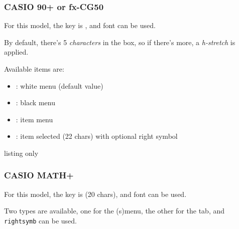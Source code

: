 \documentclass[11pt,a4paper]{ltxdoc}
\begin{document}
\subsubsection{CASIO 90+ or fx-CG50}

For this model, the key is \ShowCode{[model=90+]}, and font \ShowCode{[font=\\fontCASIOB]} can be used.

By default, there's 5 \textit{characters} in the box, so if there's more, a \textit{h-stretch} is applied.

Available items are:

\begin{itemize}[leftmargin=*]
	\item \ShowCode{[type=\{\}]}: white menu (default value) \hfill{}
	\item \ShowCode{[type=bmenu]}: black menu \hfill{}
	\item \ShowCode{[type=item]}: item menu \hfill{}
	\item \ShowCode{[type=itemsel]}: item selected (22 chars) with optional right symbol
	
	\hfill{}
\end{itemize}

\begin{DemoCode}{listing only}
\end{DemoCode}

\subsubsection{CASIO MATH+}

For this model, the key is \ShowCode{[model=math+]} (20 chars), and font \ShowCode{[font=\\fontCASIOB]} can be used.

Two types are available, one for the \textsf{(s)menu}, the other for the \textsf{tab}, and \texttt{rightsymb} can be used.
\end{document}
